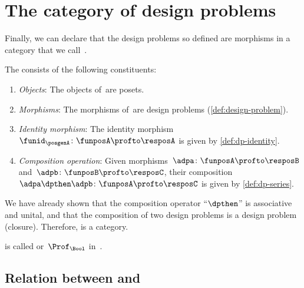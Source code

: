 
\section{The category of design problems \DP}

Finally, we can declare that the design problems so defined are morphisms in a category that we call~\DP.


\begin{definition}
    \label{def:DP}
    The \emph{ \DP} consists of the following constituents:
    \begin{enumerate}
        \item \emph{Objects}: The objects of~\DP are posets.
        \item \emph{Morphisms}: The morphisms of~\DP are design problems (\cref{def:design-problem}).
        \item \emph{Identity morphism}: The identity morphism~$\funid_\posgenA \colon \funposA \profto \resposA$ is given by \cref{def:dp-identity}.
        \item \emph{Composition operation}: Given morphisms~$\adpa \colon  \funposA \profto \resposB$ and~$\adpb \colon \funposB \profto \resposC$, their composition~$\adpa \dpthen \adpb\colon \funposA\profto \resposC$ is given by \cref{def:dp-series}.
    \end{enumerate}
\end{definition}

We have already shown that the composition operator ``$\dpthen$'' is associative and unital, and that the composition of two design problems is a design problem (closure).
Therefore, \DP is a category.

\DP is called \feas or~$\Prof_\Bool$ in~\cite{fong2019}.


\subsection{Relation between \DPI and \DP}

